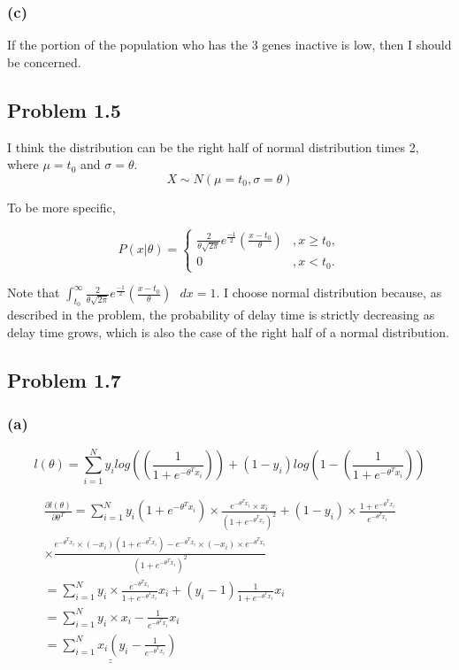 \documentclass{article}
\begin{document}
\subsubsection*{(c)}
	If the portion of the population who has the 3 genes inactive is low, then I should be concerned.
	
\subsection*{Problem 1.5}
	I think the distribution can be the right half of normal distribution times 2, where $\mu = t_0$ and $\sigma = \theta$.
	\begin{equation*}
		X\sim N(\mu = t_0,\sigma = \theta)
	\end{equation*}
	
	To be more specific,

        \[ P(x|\theta)=\begin{cases} 
              \frac{2}{ \theta \sqrt{2\pi}}e^{\frac{-1}{2}}(\frac{x-t_0}{\theta}) &, x\geq t_0, \\
              0 &, x<t_0. 
           \end{cases}
        \]
	
	Note that $\int_{t_0}^{\infty} \frac{2}{ \theta \sqrt{2\pi}}e^{\frac{-1}{2}}(\frac{x-t_0}{\theta}) \text{  }dx = 1$.
	I choose normal distribution because, as described in the problem, the probability of delay time is strictly decreasing as delay time grows, which is also the case of the right half of a normal distribution.
	

	
\subsection*{Problem 1.7}
\subsubsection*{(a)}
	\begin{equation*}
		l(\theta) = \sum_{i=1}^{N} y_ilog((\frac{1}{1+e^{-\theta^T x_i}})) + (1-y_i)log(1-(\frac{1}{1+e^{-\theta^Tx_i}})) 
	\end{equation*}
	

		\begin{equation*}
		\begin{aligned}
    		\frac{\partial l(\theta)}{\partial \theta^T} = \sum_{i=1}^{N} y_i(1+e^{-\theta^Tx_i})\times \frac{e^{-\theta^Tx_i}\times x_i}{(1+e^{-\theta^Tx_i})^2}  + (1-y_i) \times \frac{1+e^{-\theta^Tx_i}}{e^{-\theta^Tx_i}} &&\\ 
		 \times \frac{e^{-\theta^Tx_i}\times (-x_i)(1+e^{-\theta^Tx_i})-e^{-\theta^Tx_i} \times (-x_i)\times e^{-\theta^Tx_i}}{(1+e^{-\theta^Tx_i})^2 } \\
		 = \sum_{i=1}^{N}y_i \times \frac{e^{-\theta^Tx_i}}{1+e^{-\theta^Tx_i}}x_i + (y_i-1)\frac{1}{1+e^{-\theta^Tx_i}}x_i \\
		 = \sum_{i=1}^{N}y_i\times x_i - \frac{1}{e^{-\theta^Tx_i }}x_i\\
		\underline{ \underline{=\sum_{i=1}^{N}x_i(y_i-\frac{1}{e^{-\theta^Tx_i}})}}
		\end{aligned}
		\end{equation*}
\end{document}
